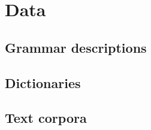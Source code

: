\section{Data} \label{data_section}

\subsection{Grammar descriptions}
\subsection{Dictionaries}
\subsection{Text corpora}